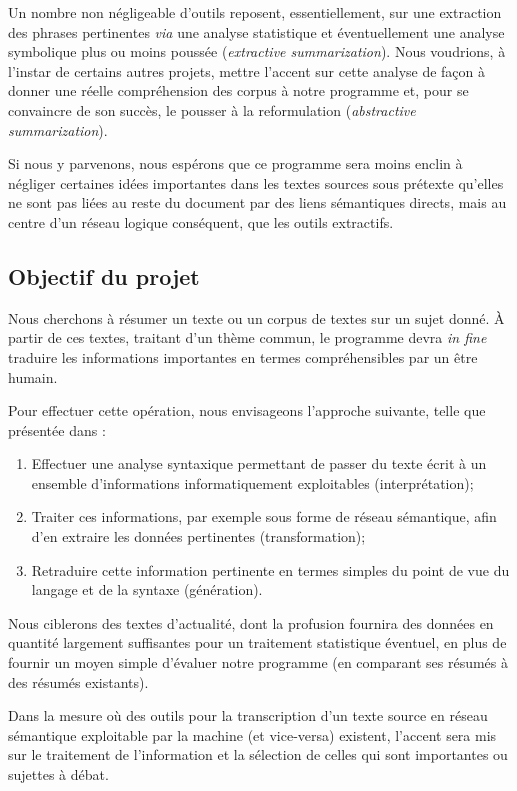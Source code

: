\documentclass{article}           %
\begin{document}
Un nombre non négligeable d'outils reposent, essentiellement, sur une extraction des phrases pertinentes \textit{via} une analyse statistique et éventuellement une analyse symbolique plus ou moins poussée (\textit{extractive summarization}). Nous voudrions, à l'instar de certains autres projets, mettre l'accent sur cette analyse de façon à donner une réelle compréhension des corpus à notre programme et, pour se convaincre de son succès, le pousser à la reformulation (\textit{abstractive summarization}).

Si nous y parvenons, nous espérons que ce programme sera moins enclin à négliger certaines idées importantes dans les textes sources sous prétexte qu'elles ne sont pas liées au reste du document par des liens sémantiques directs, mais au centre d'un réseau logique conséquent, que les outils extractifs.

\subsection{Objectif du projet}
Nous cherchons à résumer un texte ou un corpus de textes sur un sujet donné. \`{A} partir de ces textes, traitant d'un thème commun, le programme devra \textit{in fine} traduire les informations importantes en termes compréhensibles par un être humain.


Pour effectuer cette opération, nous envisageons l'approche suivante, telle que présentée dans \cite{jones_automatic_2007} :

\begin{enumerate}
 \item Effectuer une analyse syntaxique permettant de passer du texte écrit à un ensemble d'informations informatiquement exploitables (interprétation);
 \item Traiter ces informations, par exemple sous forme de réseau sémantique, afin d'en extraire les données pertinentes (transformation);
 \item Retraduire cette information pertinente en termes simples du point de vue du langage et de la syntaxe (génération).
\end{enumerate}


Nous ciblerons des textes d'actualité, dont la profusion fournira des données en quantité largement suffisantes pour un traitement statistique éventuel, en plus de fournir un moyen simple d'évaluer notre programme (en comparant ses résumés à des résumés existants).

Dans la mesure où des outils pour la transcription d'un texte source en réseau sémantique exploitable par la machine (et vice-versa) existent, l'accent sera mis sur le traitement de l'information et la sélection de celles qui sont importantes ou sujettes à débat.
\end{document}
